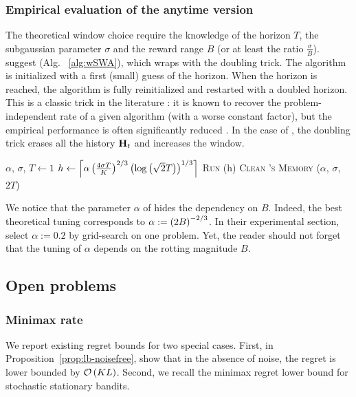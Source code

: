 \subsubsection*{Empirical evaluation of the anytime version {\wSWA}}
The theoretical window choice require the knowledge of the horizon $T$, the subgaussian parameter $\sigma$ and the reward range $B$ (or at least the ratio $\frac{\sigma}{B}$). \citet{levine2017rotting} suggest \wSWA (Alg. ~\ref{alg:wSWA}), which wraps \SWA  with the doubling trick. The algorithm is initialized with a first (small) guess of the horizon. When the horizon is reached, the algorithm is fully reinitialized and restarted with a doubled horizon. This is a classic trick in the literature : it is known to recover the problem-independent rate of a given algorithm (with a worse constant factor), but the empirical performance is often significantly reduced \citep{besson2018doubling}. In the case of \wSWA, the doubling trick erases all the history $\mathbf{H}_t$ and increases the window. 

\begin{minipage}{\textwidth}
\renewcommand*\footnoterule{}
\begin{savenotes}
\begin{algorithm}[H]
\caption{\wSWA \citep{levine2017rotting} }
\label{alg:wSWA}
\begin{algorithmic}[1]
\Require $\alpha$, $\sigma$, $T \gets 1$
\State $h \gets \left\lceil\alpha\left(\frac{4\sigma T}{K}\right)^{2/3}\left(\log\left(\sqrt{2}T\right)\right)^{1/3}\right\rceil$
		\State \textsc{Run} \SWA(h)
	\EndFor
\State \textsc{Clean \SWA's \textsc{Memory}}
\State \wSWA($\alpha$, $\sigma$, $2T$) 
\end{algorithmic}
\end{algorithm}
\end{savenotes}
\end{minipage}

We notice that the parameter $\alpha$ of \wSWA hides the dependency on $B$. Indeed, the best theoretical tuning corresponds to $\alpha := \left(2B\right)^{-2/3}$. In their experimental section, \citet{levine2017rotting} select $\alpha:= 0.2$ by grid-search on one problem. Yet, the reader should not forget that the tuning of $\alpha$ depends on the rotting magnitude $B$.

\subsection{Open problems}
\subsubsection{Minimax rate}
We report existing regret bounds for two special cases. First, in Proposition~\ref{prop:lb-noisefree}, \citet{heidari2016tight} show that in the absence of noise, the regret is lower bounded by $\mathcal{O}\left(KL\right)$. Second, we recall the minimax regret lower bound for stochastic stationary bandits.

